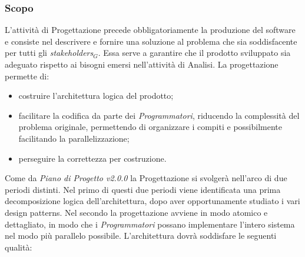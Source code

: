 \subsubsection{Scopo}
L'attività di Progettazione precede obbligatoriamente la produzione del software e consiste nel descrivere e fornire una soluzione al problema che sia soddisfacente per tutti gli \textit{stakeholders$_{G}$}. Essa serve a garantire che il prodotto sviluppato sia adeguato rispetto ai bisogni emersi nell'attività di Analisi. 
La progettazione permette di:
\begin{itemize}
	\item costruire l'architettura logica del prodotto;
	\item facilitare la codifica da parte dei \textit{Programmatori}, riducendo la complessità del problema originale, permettendo di organizzare i compiti e possibilmente facilitando la parallelizzazione;
	\item perseguire la correttezza per costruzione.
\end{itemize}
Come da \textit{Piano di Progetto v2.0.0} la Progettazione si svolgerà nell'arco di due periodi distinti. 
Nel primo di questi due periodi viene identificata una prima decomposizione logica dell'architettura, dopo aver opportunamente studiato i vari design patterns. Nel secondo la progettazione avviene in modo atomico e dettagliato, in modo che i \textit{Programmatori} possano implementare l'intero sistema nel modo più parallelo possibile. 
L'architettura dovrà soddisfare le seguenti qualità: 

